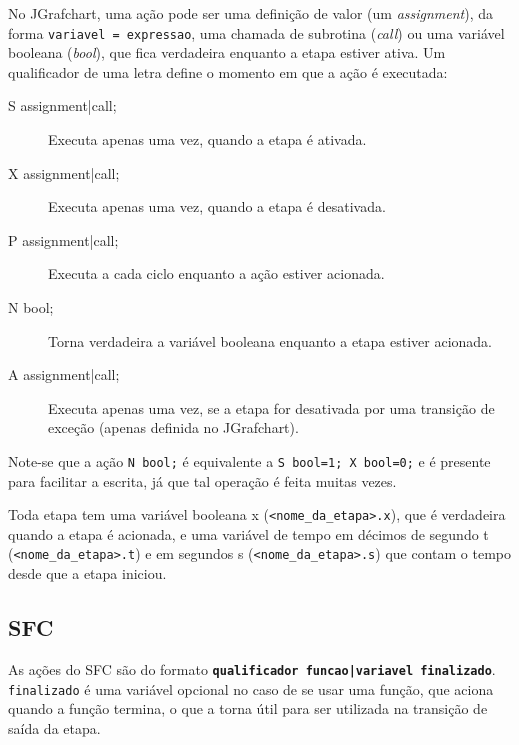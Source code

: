 No JGrafchart, uma ação pode ser uma definição de valor (um \emph{assignment}), da forma \lstinline|variavel = expressao|, uma chamada de subrotina (\emph{call}) ou uma variável booleana (\emph{bool}), que fica verdadeira enquanto a etapa estiver ativa. Um qualificador de uma letra define o momento em que a ação é executada:
\begin{description}
  \item[S assignment|call;] Executa apenas uma vez, quando a etapa é ativada.
  \item[X assignment|call;] Executa apenas uma vez, quando a etapa é desativada.
  \item[P assignment|call;] Executa a cada ciclo enquanto a ação estiver acionada.
  \item[N bool;] Torna verdadeira a variável booleana enquanto a etapa estiver acionada.
  \item[A assignment|call;] Executa apenas uma vez, se a etapa for desativada por uma transição de exceção (apenas definida no JGrafchart).
\end{description}

Note-se que a ação \lstinline/N bool;/ é equivalente a \lstinline/S bool=1; X bool=0;/ e é presente para facilitar a escrita, já que tal operação é feita muitas vezes.

Toda etapa tem uma variável booleana x (\lstinline|<nome_da_etapa>.x|), que é verdadeira quando a etapa é acionada, e uma variável de tempo em décimos de segundo t (\lstinline|<nome_da_etapa>.t|) e em segundos s (\lstinline|<nome_da_etapa>.s|) que contam o tempo desde que a etapa iniciou.

\subsection{SFC}
\label{sub:SFC}

As ações do SFC são do formato \textbf{\lstinline/qualificador funcao|variavel finalizado/}. \lstinline|finalizado| é uma variável opcional no caso de se usar uma função, que aciona quando a função termina, o que a torna útil para ser utilizada na transição de saída da etapa.

